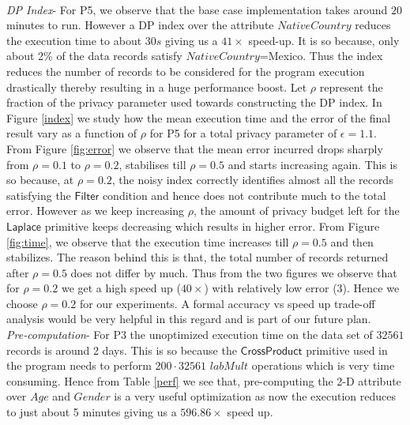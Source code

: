 \\\textit{DP Index}- For P5, we observe that the base case implementation takes around $20$ minutes to run. However  a DP index over the attribute $NativeCountry$  reduces the execution time to about $30s$ giving us a $41\times $ speed-up. It is so because, only about 2\% of the data records satisfy $NativeCountry$=Mexico. Thus the index reduces the number of records to be considered for the program execution drastically thereby resulting in a huge performance boost. %
Let $\rho$ represent the fraction of the privacy parameter used towards constructing the DP index. In Figure \ref{index} we study how the mean execution time and the error of the final result vary as a function of $\rho$ for P5 for a total privacy parameter of $\epsilon=1.1$.  From Figure \ref{fig:error} we observe that the mean error incurred drops sharply from $\rho=0.1$ to $\rho=0.2$, stabilises till $\rho=0.5$ and starts increasing again. This is so because, at $\rho=0.2$, the noisy index correctly identifies almost all the records satisfying the $\textsf{Filter}$ condition and hence does not contribute much to the total error. However as we keep increasing $\rho$, the amount of privacy budget left for the $\textsf{Laplace}$ primitive keeps decreasing which results in higher error. From Figure \ref{fig:time}, we observe that the execution time increases till $\rho=0.5$ and then stabilizes. The reason behind this is that, the total number of records returned after $\rho=0.5$ does not differ by much. Thus from the two figures we observe that for $\rho=0.2$ we get a high speed up ($40\times$) with relatively low error ($3$). Hence we choose $\rho=0.2$ for our experiments. A formal accuracy vs speed up trade-off analysis would be very helpful in this regard and is part of our future plan.
 \\\textit{Pre-computation}- For P3 the unoptimized execution time on the data set of $32561$ records is around 2 days. This is so because the $\textsf{CrossProduct}$ primitive used in the program needs to perform $200\cdot 32561$ $labMult$ operations which is very time consuming. Hence from Table \ref{perf} we see that, pre-computing the 2-D attribute over $Age$ and $Gender$ is a very useful optimization as now the execution reduces to just about 5 minutes giving us a $596.86\times$ speed up. \\ %

